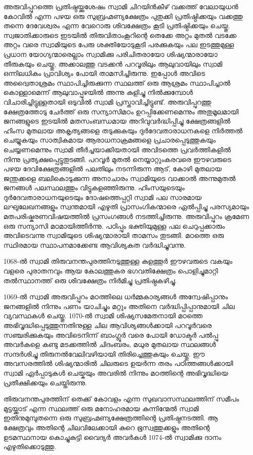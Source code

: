 \documentclass[12pt,openany]{book}
\begin{document}
	അരുവിപ്പുറത്തെ പ്രതിഷ്ഠയ്ക്കുശേഷം സ്വാമി ചിറയിൻകീഴ് വക്കത്ത് വേലായുധൻ കോവിൽ എന്ന പഴയ ഒരു സുബ്രഹ്മണ്യക്ഷേത്രം പുതുക്കി പ്രതിഷ്ഠിക്കയും വക്കത്തു തന്നെ ദേവേശ്വരം എന്ന വേറൊരു ശിവക്ഷേത്രം കൂടി പ്രതിഷ്ഠിക്കയും ചെയ്തു. സ്വജാതിക്കാരുടെ ഇടയിൽ തിരുവിതാംകൂറിന്റെ തെക്കേ അറ്റം മുതൽ വടക്കേ അറ്റം വരെ സ്വാമിയുടെ പേരു ശക്തിയോടുകൂടി പരക്കുകയും പല ഇടത്തുമുള്ള പ്രധാന യോഗ്യന്മാരെല്ലാം സ്വാമിക്കു പരിചിതരായോ ശിഷ്യന്മാരായോ തീരുകയും ചെയ്തു, അക്കാലത്തു വടക്കൻ പറവൂരിലും ആലുവായിലും സ്വാമി ഒന്നിലധികം പ്രാവിശ്യം പോയി താമസിച്ചിരുന്നു. ഇപ്പോൾ അവിടെ അദ്വൈതാശ്രമം സ്ഥാപിച്ചിരുക്കുന്ന സ്ഥലത്ത് ഒരു ആശ്രമം സ്ഥാപിച്ചാൽ കൊള്ളാമെന്ന് ആലുവാപ്പുഴയിൽ അന്നു കുളിച്ചു നിൽക്കുമ്പോൾ വിചാരിച്ചിട്ടുള്ളതായി ഒടുവിൽ സ്വാമി പ്രസ്താവിച്ചിട്ടുണ്ട്. അരുവിപ്പുറത്തു ക്ഷേത്രത്തോടു ചേർത്ത് ഒരു സന്യാസിമഠം ഉറപ്പിക്കേണമെന്നും അതുമൂലമായി ജനങ്ങളുടെ ഇടയിൽ മതസംബന്ധമായ അറിവുവർദ്ധിപ്പിച്ചു ക്ഷേത്രങ്ങളിൽ ഹിംസ മുതലായ അകൃത്യങ്ങളെ തടുക്കുകയും ദുർദേവതാരാധനകളെ നിർത്തൽ ചെയ്യുകയും സാത്വികമായ ആരാധനാക്രമങ്ങളെ പ്രചാരപ്പെടുത്തുകയും ചെയ്യണമെന്നും സ്വാമി തീർച്ചയാക്കിയതായി അവിടത്തെ പ്രവർത്തികളിൽ നിന്നു പ്രത്യക്ഷപ്പെട്ടുതുടങ്ങി. പറവൂർ മുതൽ നെയ്യാറ്റുംകരവരെ ഈഴവരുടെ പഴയ ദേവിക്ഷേത്രങ്ങളിൽ പലതിലും നടന്നിരുന്ന ആട്, കോഴി മുതലായ ജന്തുക്കളെ ബലികൊടുക്കുന്ന അനാചാരം സ്വാമിയുടെ വാക്കാൽ അന്നുമുതൽ ജനങ്ങൾ പലസ്ഥലത്തും വിട്ടുകളഞ്ഞിരുന്നു. ഹിംസയുടെയും ദുർദേവതാരാധനയുടെയും ദോഷത്തെപ്പറ്റി സ്വാമി പല സാരമായ ലഘുലേഖനങ്ങളും സ്വന്തമായി എഴുതി പ്രാസംഗികന്മാരെ ഏൽപ്പിച്ചു പരസ്യമായും മതപരിഷ്കരണവിഷയത്തിൽ പ്രസംഗങ്ങൾ നടത്തിച്ചിരുന്നു. അരുവിപ്പുറം ക്രമേണ ഒരു സന്യാസി മഠമായിത്തീർന്നു. പഠിപ്പും ഭക്തിയുമുള്ള പല ചെറുപ്പക്കാരും അവിടെവന്നു സ്വാമിയുടെ ശിഷ്യന്മാരായി താമസം തുടങ്ങി. മഠത്തെ ഒരു സ്ഥിരമായ സ്ഥാപനമാക്കേണ്ട ആവിശ്യകത വർദ്ധിച്ചുവന്നു.
	
	1068-ൽ സ്വാമി തിരുവനന്തപുരത്തിനടുത്തുള്ള കുളത്തൂർ ഈഴവരുടെ വകയും വളരെ പുരാതനവും ആയ കോലത്തുകര ഭഗവതിക്ഷേത്രം പൊളിച്ചുമാറ്റി തൽസ്ഥാനത്ത് ഒരു ശിവക്ഷേത്രം നിർമിച്ചു പ്രതിഷ്ഠകഴിച്ചു.
	
	1069-ൽ സ്വാമി അരുവിപ്പുറം മഠത്തിലെ ധർമ്മകാര്യങ്ങൾ അന്വേഷിപ്പാനും ജനങ്ങളിൽ നിന്നും പണം യാചിച്ചും മറ്റും അതിനെ വർദ്ധിപ്പിപ്പാനുമായി ചില വ്യവസ്ഥകൾ ചെയ്തു. 1070-ൽ സ്വാമി ശിഷ്യസമേതനായി മഠത്തെ അഭിവൃദ്ധിപ്പെടുത്തുന്നതിനുള്ള ചില ആവിശ്യങ്ങൾക്കായി പറവൂർവരെ സഞ്ചരിക്കുകയും അവിടെനിന്ന് ബാംഗ്ലൂർ വരെ പോയി ഡോക്ടർ പൽപ്പു അവർകളെ കണ്ടു മടക്കത്തിൽ ചിദംബരം, മധുര മുതലായ സ്ഥലങ്ങൾ സന്ദർശിച്ചു തിരുനൽവേലിവഴിയായി തിരിച്ചെത്തുകയും ചെയ്തു. ഈ അവസരത്തിൽ ശിഷ്യന്മാരിൽ ചിലരുടെ ഉയർന്ന തരം പഠിത്തങ്ങൾക്കായി സ്വാമി ഏർപ്പാടുകൾ ചെയ്കയും അവരിൽ നിന്നും മഠത്തിന്റെ അഭിവൃദ്ധിയെ പ്രതീക്ഷിക്കയും ചെയ്തിരുന്നു.
	
	തിരുവനന്തപുരത്തിന് തെക്ക് കോവളം എന്ന സുഖവാസസ്ഥലത്തിന് സമീപം മുട്ടയ്ക്കാട് എന്ന സ്ഥലത്ത് ഒരു മനോഹരമായ കുന്നിന്മേൽ സ്വാമി ഇതിനുമുമ്പുതന്നെ ഒരു സുബ്രഹ്മണ്യക്ഷേത്രത്തിന്റെ പ്രതിഷ്ഠനടത്തി. ആ ക്ഷേത്രവും അതിന്റെ ചിലവിലേക്കായി കുറെ ഭൂസ്വത്തുക്കളും അതിന്റെ ഉടമസ്ഥനായ കൊച്ചുകുട്ടി വൈദ്യർ അവർകൾ 1074-ൽ സ്വാമിക്കു ദാനം എഴുതിക്കൊടുത്തു.
	
\end{document}
